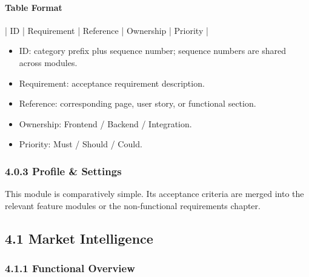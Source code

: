 \paragraph{Table Format}

\begin{codeblock}
| ID | Requirement | Reference | Ownership | Priority |
\end{codeblock}

\begin{itemize}
\item ID: category prefix plus sequence number; sequence numbers are shared across modules.
\item Requirement: acceptance requirement description.
\item Reference: corresponding page, user story, or functional section.
\item Ownership: Frontend / Backend / Integration.
\item Priority: Must / Should / Could.
\end{itemize}

\subsubsection{4.0.3 Profile \& Settings}

This module is comparatively simple. Its acceptance criteria are merged into the relevant feature modules or the non-functional requirements chapter.

\subsection{4.1 Market Intelligence}

\subsubsection{4.1.1 Functional Overview}

